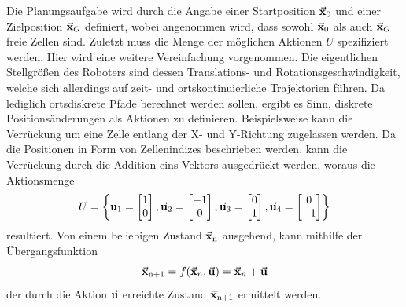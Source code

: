 Die Planungsaufgabe wird durch die Angabe einer Startposition $\vec{\mathbf{x}}_0$ und einer Zielposition $\vec{\mathbf{x}}_G$ definiert, wobei angenommen wird, dass sowohl $\vec{\mathbf{x}}_0$ als auch $\vec{\mathbf{x}}_G$ freie Zellen sind.
Zuletzt muss die Menge der möglichen Aktionen $U$ spezifiziert werden. Hier wird eine weitere Vereinfachung vorgenommen. Die eigentlichen Stellgrößen des Roboters sind dessen Translations- und Rotationsgeschwindigkeit, welche sich allerdings auf zeit- und ortskontinuierliche Trajektorien führen. Da lediglich ortsdiskrete Pfade berechnet werden sollen, ergibt es Sinn, diskrete Positionsänderungen als Aktionen zu definieren. Beispielsweise kann die Verrückung um eine Zelle entlang der X- und Y-Richtung zugelassen werden. Da die Positionen in Form von Zellenindizes beschrieben werden, kann die Verrückung durch die Addition eins Vektors ausgedrückt werden, woraus die Aktionsmenge
\begin{equation}\label{eq_Uset}
U = \left\{ 
\vec{\mathbf{u}}_{\text{1}} = \begin{bmatrix} 1 \\ 0 \end{bmatrix}, 
\vec{\mathbf{u}}_{\text{2}} = \begin{bmatrix} -1 \\ 0 \end{bmatrix},
\vec{\mathbf{u}}_{\text{3}} = \begin{bmatrix} 0 \\ 1 \end{bmatrix},
\vec{\mathbf{u}}_{\text{4}} = \begin{bmatrix} 0 \\ -1\end{bmatrix} \right\}
\end{equation}
resultiert. Von einem beliebigen Zustand $\vec{\mathbf{x}}_{\text{n}}$ ausgehend, kann mithilfe der Übergangsfunktion
\begin{equation}\label{eq_fxnew}
\vec{\mathbf{x}}_{\text{n+1}} = f(\vec{\mathbf{x}}_n, \vec{\mathbf{u}}) = \vec{\mathbf{x}}_n + \vec{\mathbf{u}}
\end{equation}
der durch die Aktion $\vec{\mathbf{u}}$ erreichte Zustand $\vec{\mathbf{x}}_{\text{n+1}}$ ermittelt werden.


